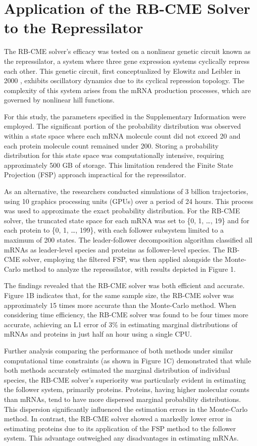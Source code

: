 \documentclass[11pt]{isr} %
\begin{document}
\section*{Application of the RB-CME Solver to the Repressilator}

The RB-CME solver's efficacy was tested on a nonlinear genetic circuit known as the repressilator, a system where three gene expression systems cyclically repress each other. This genetic circuit, first conceptualized by Elowitz and Leibler in 2000 \cite{elowitz}, exhibits oscillatory dynamics due to its cyclical repression topology. The complexity of this system arises from the mRNA production processes, which are governed by nonlinear hill functions.

For this study, the parameters specified in the Supplementary Information were employed. The significant portion of the probability distribution was observed within a state space where each mRNA molecule count did not exceed 20 and each protein molecule count remained under 200. Storing a probability distribution for this state space was computationally intensive, requiring approximately 500 GB of storage. This limitation rendered the Finite State Projection (FSP) approach impractical for the repressilator.

As an alternative, the researchers conducted simulations of 3 billion trajectories, using 10 graphics processing units (GPUs) over a period of 24 hours. This process was used to approximate the exact probability distribution. For the RB-CME solver, the truncated state space for each mRNA was set to \{0, 1, \ldots, 19\} and for each protein to \{0, 1, \ldots, 199\}, with each follower subsystem limited to a maximum of 200 states. The leader-follower decomposition algorithm classified all mRNAs as leader-level species and proteins as follower-level species. The RB-CME solver, employing the filtered FSP, was then applied alongside the Monte-Carlo method to analyze the repressilator, with results depicted in Figure 1.

The findings revealed that the RB-CME solver was both efficient and accurate. Figure 1B indicates that, for the same sample size, the RB-CME solver was approximately 15 times more accurate than the Monte-Carlo method. When considering time efficiency, the RB-CME solver was found to be four times more accurate, achieving an L1 error of 3\% in estimating marginal distributions of mRNAs and proteins in just half an hour using a single CPU.

Further analysis comparing the performance of both methods under similar computational time constraints (as shown in Figure 1C) demonstrated that while both methods accurately estimated the marginal distribution of individual species, the RB-CME solver's superiority was particularly evident in estimating the follower system, primarily proteins. Proteins, having higher molecular counts than mRNAs, tend to have more dispersed marginal probability distributions. This dispersion significantly influenced the estimation errors in the Monte-Carlo method. In contrast, the RB-CME solver showed a markedly lower error in estimating proteins due to its application of the FSP method to the follower system. This advantage outweighed any disadvantages in estimating mRNAs.
\end{document}
